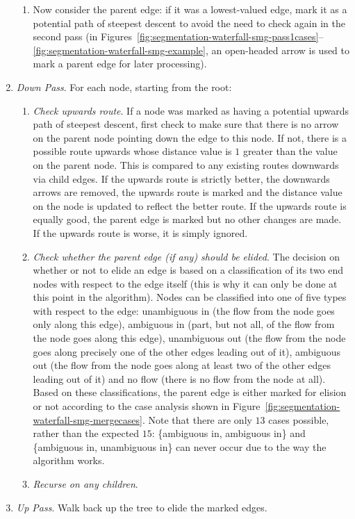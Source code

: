 \begin{enumerate}
\begin{enumerate}
\item Now consider the parent edge: if it was a lowest-valued edge, mark it as a potential path of steepest descent to avoid the need to check again in the second pass (in Figures~\ref{fig:segmentation-waterfall-smg-pass1cases}--\ref{fig:segmentation-waterfall-smg-example}, an open-headed arrow is used to mark a parent edge for later processing).

\end{enumerate}

\item \emph{Down Pass}. For each node, starting from the root:

\begin{enumerate}

\item \emph{Check upwards route}. If a node was marked as having a potential upwards path of steepest descent, first check to make sure that there is no arrow on the parent node pointing down the edge to this node. If not, there is a possible route upwards whose distance value is $1$ greater than the value on the parent node. This is compared to any existing routes downwards via child edges. If the upwards route is strictly better, the downwards arrows are removed, the upwards route is marked and the distance value on the node is updated to reflect the better route. If the upwards route is equally good, the parent edge is marked but no other changes are made. If the upwards route is worse, it is simply ignored.

\item \emph{Check whether the parent edge (if any) should be elided}. The decision on whether or not to elide an edge is based on a classification of its two end nodes with respect to the edge itself (this is why it can only be done at this point in the algorithm). Nodes can be classified into one of five types with respect to the edge: unambiguous in (the flow from the node goes only along this edge), ambiguous in (part, but not all, of the flow from the node goes along this edge), unambiguous out (the flow from the node goes along precisely one of the other edges leading out of it), ambiguous out (the flow from the node goes along at least two of the other edges leading out of it) and no flow (there is no flow from the node at all). Based on these classifications, the parent edge is either marked for elision or not according to the case analysis shown in Figure~\ref{fig:segmentation-waterfall-smg-mergecases}. Note that there are only $13$ cases possible, rather than the expected $15$: \{ambiguous in, ambiguous in\} and \{ambiguous in, unambiguous in\} can never occur due to the way the algorithm works.

\item \emph{Recurse on any children}.

\end{enumerate}

\item \emph{Up Pass}. Walk back up the tree to elide the marked edges.

\end{enumerate}

